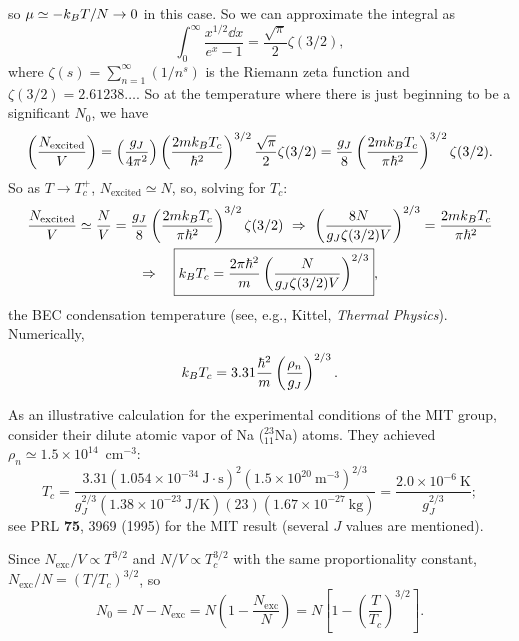 so $\mu\simeq-k_{B} T/N\to 0$ in this case. So we can approximate the integral as
\begin{equation}
  \int_0^\infty\frac{x^{1/2}\dd x}{e^x-1} = \frac{\sqrt\pi}{2}\zeta(3/2),
\end{equation}
where $\zeta(s) = \sum_{n=1}^\infty(1/n^s)$ is the Riemann zeta function and $\zeta(3/2) = 2.61238\ldots$. So at the
temperature where there is just beginning to be a significant $N_0$, we have
\begin{equation}
  \left(\frac{N_{\text{excited}}}{V}\right) = \left(\frac{g_J}{4\pi^2}\right)\left(\frac{2mk_{B} T_c}{\hbar^2}\right)^{3/2}\frac{\sqrt\pi}{2}\zeta(3/2)
  = \frac{g_J}{8}\left(\frac{2mk_{B} T_c}{\pi\hbar^2}\right)^{3/2}\zeta(3/2).
\end{equation}
So as $T\to T_c^+$, $N_{\text{excited}}\simeq N$, so, solving for $T_c$:
\begin{gather}
  \frac{N_{\text{excited}}}{V}\simeq\frac{N}{V} = \frac{g_J}{8}\left(\frac{2mk_{B} T_c}{\pi\hbar^2}\right)^{3/2}\zeta(3/2)
  \ \Rightarrow\ \left(\frac{8N}{g_J\zeta(3/2)V}\right)^{2/3} = \frac{2mk_{B} T_c}{\pi\hbar^2}\nonumber\\
  \Rightarrow\quad\boxed{k_{B} T_c = \frac{2\pi\hbar^2}{m}\left(\frac{N}{g_J\zeta(3/2)V}\right)^{2/3}},
\end{gather}
the BEC condensation temperature (see, e.g., Kittel, \emph{Thermal Physics}). Numerically,
\begin{equation}
  k_{B} T_c = 3.31\frac{\hbar^2}{m}\left(\frac{\rho_n}{g_J}\right)^{2/3}.
\end{equation}

As an illustrative calculation for the experimental conditions of the MIT group, consider their dilute atomic vapor of Na
($^{23}_{11}$Na) atoms. They achieved $\rho_n\simeq 1.5\times 10^{14}$~cm$^{-3}$:
\begin{equation}
  T_c = \frac{3.31(1.054\times 10^{-34}\ \text{J}\cdot\text{s})^2(1.5\times 10^{20}\ \text{m}^{-3})^{2/3}}{g_J^{2/3}(1.38\times 10^{-23}\ \text{J/K})(23)(1.67\times 10^{-27}\ \text{kg})}
  = \frac{2.0\times 10^{-6}\ \text{K}}{g_J^{2/3}};
\end{equation}
see PRL \textbf{75}, 3969 (1995) for the MIT result (several $J$ values are mentioned).

Since $N_{\text{exc}}/V\propto T^{3/2}$ and $N/V\propto T_c^{3/2}$ with the same proportionality constant,
$N_{\text{exc}}/N = \left(T/T_c\right)^{3/2}$, so
\begin{equation}
  N_0 = N - N_{\text{exc}} = N\left(1-\frac{N_{\text{exc}}}{N}\right) = N\left[1-\left(\frac{T}{T_c}\right)^{3/2}\right].
\end{equation}

